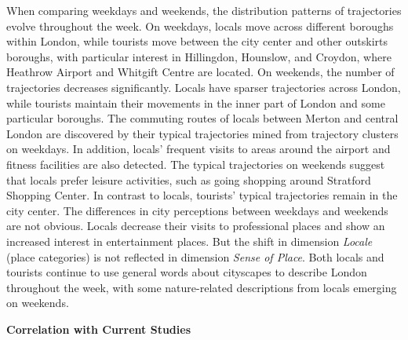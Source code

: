 \documentclass{article}
\theoremstyle{remark}
\begin{document}
When comparing weekdays and weekends, the distribution patterns of trajectories evolve throughout the week. On weekdays, locals move across different boroughs within London, while tourists move between the city center and other outskirts boroughs, with particular interest in Hillingdon, Hounslow, and Croydon, where Heathrow Airport and Whitgift Centre are located. On weekends, the number of trajectories decreases significantly. Locals have sparser trajectories across London, while tourists maintain their movements in the inner part of London and some particular boroughs. The commuting routes of locals between Merton and central London are discovered by their typical trajectories mined from trajectory clusters on weekdays. In addition, locals' frequent visits to areas around the airport and fitness facilities are also detected. The typical trajectories on weekends suggest that locals prefer leisure activities, such as going shopping around Stratford Shopping Center. In contrast to locals, tourists' typical trajectories remain in the city center. The differences in city perceptions between weekdays and weekends are not obvious. Locals decrease their visits to professional places and show an increased interest in entertainment places. But the shift in dimension \textit{Locale} (place categories) is not reflected in dimension \textit{Sense of Place}. Both locals and tourists continue to use general words about cityscapes to describe London throughout the week, with some nature-related descriptions from locals emerging on weekends.


\textbf{Correlation with Current Studies}
\end{document}
